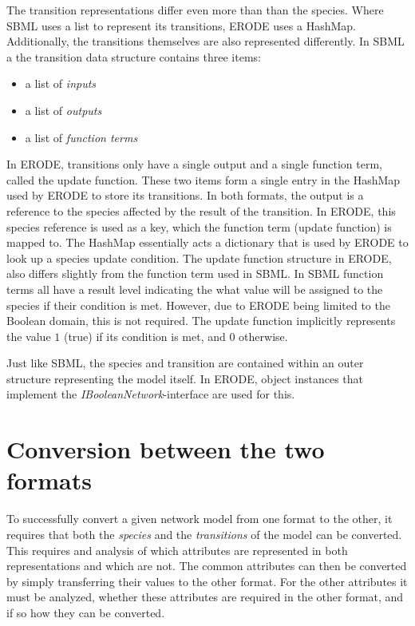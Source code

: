 The transition representations differ even more than than the species. Where SBML uses a list to represent its transitions, ERODE uses a HashMap. Additionally, the transitions themselves are also represented differently.
In SBML a the transition data structure contains three items:
\begin{itemize}
    \item a list of \emph{inputs}
    \item a list of \emph{outputs}
    \item a list of \emph{function terms}
\end{itemize}
In ERODE, transitions only have a single output and a single function term, called the update function. These two items form a single entry in the HashMap used by ERODE to store its transitions. In both formats, the output is a reference to the species affected by the result of the transition. In ERODE, this species reference is used as a key, which the function term (update function) is mapped to. The HashMap essentially acts a dictionary that is used by ERODE to look up a species update condition.
The update function structure in ERODE, also differs slightly from the function term used in SBML. In SBML function terms all have a result level indicating the what value will be assigned to the species if their condition is met. However, due to ERODE being limited to the Boolean domain, this is not required. The update function implicitly represents the value $1$ (true) if its condition is met, and $0$ otherwise.

Just like SBML, the species and transition are contained within an outer structure representing the model itself. In ERODE, object instances that implement the \emph{IBooleanNetwork}-interface are used for this.

\section{Conversion between the two formats}
To successfully convert a given network model from one format to the other, it requires that both the \emph{species} and the \emph{transitions} of the model can be converted.
This requires and analysis of which attributes are represented in both representations and which are not.
The common attributes can then be converted by simply transferring their values to the other format. For the other attributes it must be analyzed, whether these attributes are required in the other format, and if so how they can be converted.

